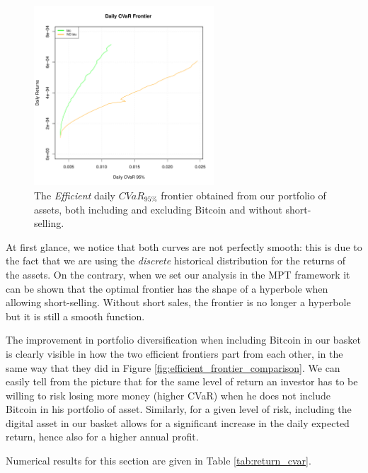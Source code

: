 \begin{figure}
	\centering
	\includegraphics[width=0.6\textwidth]{Images/efficient_frontier_CVaR.pdf}
	\caption[Efficient CVaR frontier comparison]{The \textit{Efficient} daily $CVaR_{95\%}$ frontier obtained from our portfolio of assets, both including and excluding Bitcoin and without short-selling.}
	\label{fig:cvar_efficient_frontier_comparison}
\end{figure}


At first glance, we notice that both curves are not perfectly smooth: this is due to the fact that we are using the \textit{discrete} historical distribution for the returns of the assets. On the contrary, when we set our analysis in the MPT framework it can be shown that the optimal frontier has the shape of a hyperbole when allowing short-selling. Without short sales, the frontier is no longer a hyperbole but it is still a smooth function.

The improvement in portfolio diversification when including Bitcoin in our basket is clearly visible in how the two efficient frontiers part from each other, in the same way that they did in Figure \ref{fig:efficient_frontier_comparison}.
We can easily tell from the picture that for the same level of return an investor has to be willing to risk losing more money (higher CVaR) when he does not include Bitcoin in his portfolio of asset.
Similarly, for a given level of risk, including the digital asset in our basket allows for a significant increase in the daily expected return,  hence also for a higher annual profit.

Numerical results for this section are given in Table \ref{tab:return_cvar}.

